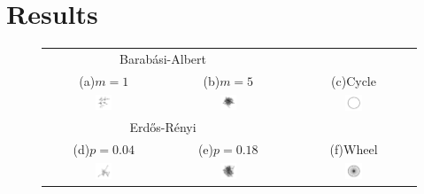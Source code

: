 \documentclass[letterpaper]{article}
\newcommand{\BA}{Barab\'{a}si-Albert~}
\newcommand{\BAbox}{\mbox{\BA}}
\newcommand{\ER}{Erd\H{o}s-R\'{e}nyi~}
\newcommand{\ERbox}{\mbox{\ER}}
\begin{document}
\section{Results}\label{sec:results}

\begin{figure}[!h]
    \begin{tabular}{ccc}
        \multicolumn{2}{c}{\BAbox} & \\
        {\footnotesize (a)\quad$m=1$} & {\footnotesize (b)\quad$m=5$} & {\footnotesize (c)\quad Cycle} \\
        \includegraphics[width=0.14\textwidth]{"topologies/ba1"} &
        \includegraphics[width=0.14\textwidth]{"topologies/ba5"} &
        \includegraphics[width=0.14\textwidth]{"topologies/cycle"} \\
        \multicolumn{2}{c}{\ERbox} & \\
        {\footnotesize (d)\quad$p=0.04$} & {\footnotesize (e)\quad$p=0.18$}& {\footnotesize (f)\quad Wheel} \\
        \includegraphics[width=0.14\textwidth]{"topologies/er0.04"} &
        \includegraphics[width=0.14\textwidth]{"topologies/er0.18"} &
        \includegraphics[width=0.14\textwidth]{"topologies/wheel"} \\

\end{tabular}
\end{figure}
\end{document}
